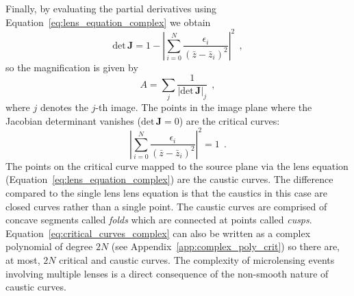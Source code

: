 \documentclass[12pt,dvipsnames]{report}
\newcommand{\hquad}{~~}
\begin{document}
Finally, by evaluating the partial derivatives
using Equation~\ref{eq:lens_equation_complex} we obtain
\begin{equation}
    \mathrm{det} \,\mathbf J=1-\left|\sum_{i=0}^{N} \frac{\epsilon_{i}}{\left(\bar{z}-\bar{z}_i\right)^{2}}\right|^{2}
    \hquad,
    \label{eq:lens_eq_det_jac}
\end{equation}
so the magnification is given by
\begin{equation}
    A = \sum_j \frac{1}{\left|\mathrm{det}\,\mathbf J\right|_j}
    \hquad,
\end{equation}
where $j$ denotes the $j$-th image. The points in the image plane where the Jacobian determinant vanishes
($\mathrm{det}\,\mathbf J=0$) are the critical curves:
\begin{equation}
    \left|\sum_{i=0}^{N} \frac{\epsilon_{i}}{\left(\bar{z}-\bar{z}_i\right)^{2}}\right|^{2}=1
    \hquad.
    \label{eq:critical_curves_complex}
\end{equation}
The points on the critical curve mapped to the source plane via
the lens equation (Equation~\ref{eq:lens_equation_complex}) are the caustic curves.
The difference compared to the single lens lens equation is that the caustics in this case are closed curves
rather than a single point. The caustic curves are comprised of concave segments called \emph{folds} which are connected
at points called \emph{cusps}.
Equation~\ref{eq:critical_curves_complex} can also be written as a complex polynomial of
degree $2N$ (see Appendix~\ref{app:complex_poly_crit}) so there are, at most, 
$2N$ critical and caustic curves.
The complexity of microlensing events involving multiple lenses is a direct consequence of the 
non-smooth nature of caustic curves.
\end{document}
